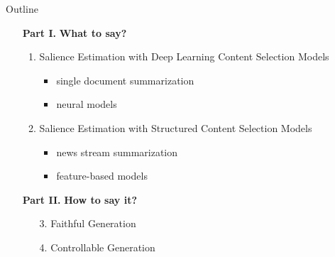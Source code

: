\begin{frame}{Outline}
    \begin{itemize}
        \item[\textbf{Part I.}] \textbf{What to say?}
        \begin{enumerate}
            \item Salience Estimation with Deep Learning Content Selection
                    Models
        \begin{itemize}
            \item single document summarization
            \item neural models
        \end{itemize}
            \item Salience Estimation with Structured Content Selection Models 
        \begin{itemize}
            \item news stream summarization
            \item feature-based models
        \end{itemize}
        \end{enumerate}
        \vspace{10pt}
    \item[\textbf{Part II.}] \textbf{How to say it?}
        \begin{enumerate}
            \item[3.] Faithful Generation
            \item[4.] Controllable Generation
        \end{enumerate}
    \end{itemize}

\end{frame}

